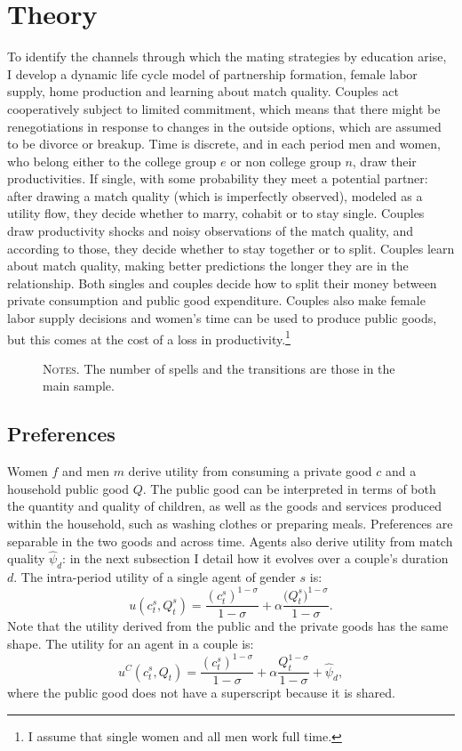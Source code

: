 \documentclass[12pt]{article}
\begin{document}
\section{Theory}
To identify the channels through which the mating strategies by education arise, I
develop a dynamic life cycle model of partnership formation, female labor supply, home production and learning about match quality. Couples act cooperatively subject to limited commitment, which means that there might be renegotiations in response to changes in the outside options, which are assumed to be divorce or breakup. Time is discrete, and in each period men and women, who belong either to the college group $e$ or non college group $n$, draw their productivities. If single, with some probability they meet a potential partner: after drawing a match quality (which is imperfectly observed), modeled as a utility flow, they decide whether to marry, cohabit or to stay single. Couples draw productivity shocks and noisy observations of the match quality, and according to those, they decide whether to stay together or to split.
Couples learn about match quality, making better predictions the longer they are in the relationship. Both singles and couples decide how to split their money between private consumption and public good expenditure. Couples also make female labor supply decisions and women's time can be used to produce public goods, but this comes at the cost of a loss in productivity.\footnote{I assume that single women and all men work full time.}
\begin{figure}[h!]
\label{fig:scheme}
\caption{}
\hspace{0.3cm}
\resizebox{0.99\textwidth}{!}{}
\begin{minipage}{0.99\textwidth} %
\hspace{3em}
{\footnotesize \textsc{Notes.}  The number of spells and the transitions are those in the main sample.\par}
\end{minipage}
\end{figure}
\subsection{Preferences}
Women $f$ and men $m$ derive utility from consuming a private good $c$ and a household public good $Q$. The public good can be interpreted in terms of both the quantity and quality of children, as well as the goods and services produced within the household, such as washing clothes or preparing meals. Preferences are separable in the two goods and across time. Agents also derive utility from match quality $\hat{\psi}_d$: in the next subsection I detail how it evolves over a couple's duration $d$. The intra-period utility of a single agent of gender $s$ is:
\[u(c^{s}_t,Q^{s}_t)=\frac{{(c^s_t)}^{1-\sigma}}{1-\sigma}+\alpha\frac{{(Q^{s}_t})^{1-\sigma}}{1-\sigma}.\]
Note that the utility derived from the public and the private goods has the same shape. The utility for an agent in a couple is:
\[u^{C}(c^s_t,Q_t)=\frac{{(c^s_t)}^{1-\sigma}}{1-\sigma}+\alpha\frac{Q_t^{1-\sigma}}{1-\sigma}+\hat{\psi}_d,\]
where the public good does not have a superscript because it is shared.
\end{document}
